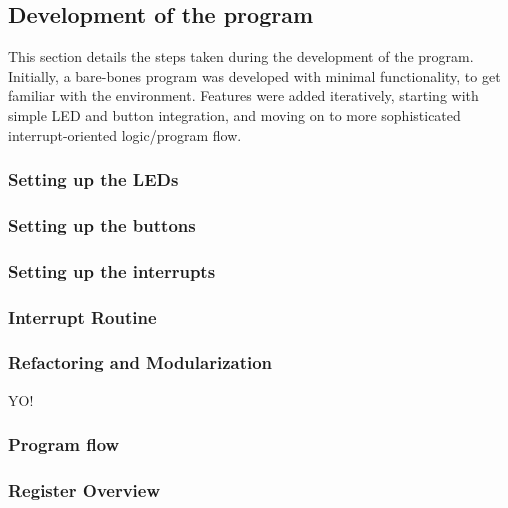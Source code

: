 \subsection{Development of the program}

This section details the steps taken during the development of the program.
Initially, a bare-bones program was developed with minimal functionality, to get familiar with the environment.
Features were added iteratively, starting with simple LED and button integration, and moving on to more sophisticated interrupt-oriented logic/program flow.

    \subsubsection{Setting up the LEDs}
        
        

    \subsubsection{Setting up the buttons}

        

    \subsubsection{Setting up the interrupts}

        

    \subsubsection{Interrupt Routine}
        

    \subsubsection{Refactoring and Modularization}

        YO!

    \subsubsection{Program flow}

        

    \subsubsection{Register Overview}

        

